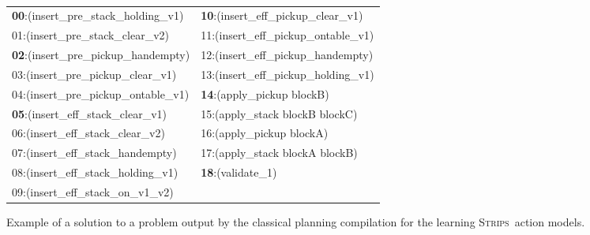 \documentclass{article}
\newcommand{\strips}{\textsc{Strips}}
\begin{document}
\begin{figure}[hbt!]
	{\tiny\tt
\begin{tabular}{ll}
		{\bf 00}:(insert\_pre\_stack\_holding\_v1) & {\bf 10}:(insert\_eff\_pickup\_clear\_v1) \\
		01:(insert\_pre\_stack\_clear\_v2) & 11:(insert\_eff\_pickup\_ontable\_v1)\\
                {\bf 02}:(insert\_pre\_pickup\_handempty) & 12:(insert\_eff\_pickup\_handempty)\\
                03:(insert\_pre\_pickup\_clear\_v1) & 13:(insert\_eff\_pickup\_holding\_v1)\\
                04:(insert\_pre\_pickup\_ontable\_v1) & {\bf 14}:(apply\_pickup blockB)\\
                {\bf 05}:(insert\_eff\_stack\_clear\_v1) & 15:(apply\_stack blockB blockC)\\
                06:(insert\_eff\_stack\_clear\_v2) & 16:(apply\_pickup blockA)\\
                07:(insert\_eff\_stack\_handempty) & 17:(apply\_stack blockA blockB) \\
                08:(insert\_eff\_stack\_holding\_v1) &  {\bf 18}:(validate\_1)\\
                09:(insert\_eff\_stack\_on\_v1\_v2) &             		
\end{tabular}
}
	\caption{\small Example of a solution to a problem output by the classical planning compilation for the learning \strips\ action models.}
	\label{fig:plan-lplan}
\end{figure}

\end{document}
